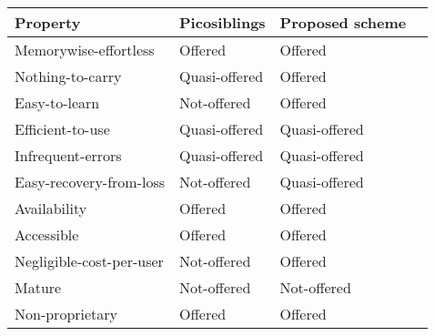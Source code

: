 \begin{table}
    \begin{tabular}{l|l|l|l}
    Property                            & Picosiblings  						& Proposed scheme \\ \hline
    Memorywise-effortless               & \cellcolor{green!25}Offered       	& \cellcolor{green!25}Offered          	\\
    Nothing-to-carry                    & \cellcolor{yellow!25}Quasi-offered   	& \cellcolor{green!25}Offered          	\\
    Easy-to-learn                       & \cellcolor{red!25}Not-offered   		& \cellcolor{green!25}Offered          	\\
    Efficient-to-use                    & \cellcolor{yellow!25}Quasi-offered 	& \cellcolor{yellow!25}Quasi-offered   	\\
    Infrequent-errors                   & \cellcolor{yellow!25}Quasi-offered 	& \cellcolor{yellow!25}Quasi-offered   	\\
    Easy-recovery-from-loss             & \cellcolor{red!25}Not-offered   		& \cellcolor{yellow!25}Quasi-offered   	\\
    Availability                        & \cellcolor{green!25}Offered       	& \cellcolor{green!25}Offered      	   	\\ \hline
	
    Accessible                          & \cellcolor{green!25}Offered       	& \cellcolor{green!25}Offered          	\\
    Negligible-cost-per-user            & \cellcolor{red!25}Not-offered   		& \cellcolor{green!25}Offered          	\\
    Mature                              & \cellcolor{red!25}Not-offered   		& \cellcolor{red!25}Not-offered    		\\
    Non-proprietary                     & \cellcolor{green!25}Offered       	& \cellcolor{green!25}Offered      		\\ \hline
	

\end{tabular}
\end{table}
